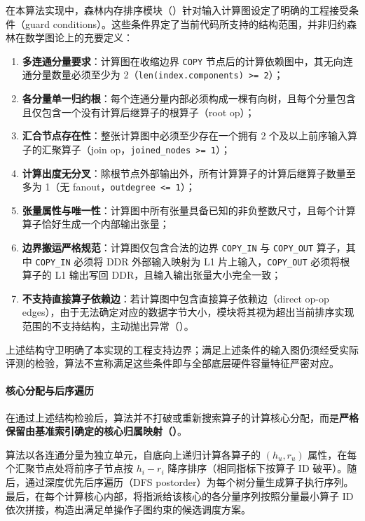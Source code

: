 \documentclass[anonymous,withtoc]{gmcm2026}
\providecommand{\tightlist}{\setlength{\itemsep}{0pt}\setlength{\parskip}{0pt}}
\begin{document}
在本算法实现中，森林内存排序模块（\texttt{}）针对输入计算图设定了明确的工程接受条件（guard conditions）。这些条件界定了当前代码所支持的结构范围，并非归约森林在数学图论上的充要定义：

\begin{enumerate}
\def\labelenumi{\arabic{enumi}.}
\tightlist
\item
  \textbf{多连通分量要求}：计算图在收缩边界 \texttt{COPY} 节点后的计算依赖图中，其无向连通分量数量必须至少为 2（\texttt{len(index.components)\ \textgreater{}=\ 2}）；
\item
  \textbf{各分量单一归约根}：每个连通分量内部必须构成一棵有向树，且每个分量包含且仅包含一个没有计算后继算子的根算子（root op）；
\item
  \textbf{汇合节点存在性}：整张计算图中必须至少存在一个拥有 2 个及以上前序输入算子的汇聚算子（join op，\texttt{joined\_nodes\ \textgreater{}=\ 1}）；
\item
  \textbf{计算出度无分叉}：除根节点外部输出外，所有计算算子的计算后继算子数量至多为 1（无 fanout，\texttt{outdegree\ \textless{}=\ 1}）；
\item
  \textbf{张量属性与唯一性}：计算图中所有张量具备已知的非负整数尺寸，且每个计算算子恰好生成一个内部输出张量；
\item
  \textbf{边界搬运严格规范}：计算图仅包含合法的边界 \texttt{COPY\_IN} 与 \texttt{COPY\_OUT} 算子，其中 \texttt{COPY\_IN} 必须将 DDR 外部输入映射为 L1 片上输入，\texttt{COPY\_OUT} 必须将根算子的 L1 输出写回 DDR，且输入输出张量大小完全一致；
\item
  \textbf{不支持直接算子依赖边}：若计算图中包含直接算子依赖边（direct op-op edges），由于无法确定对应的数据字节大小，模块将其视为超出当前排序实现范围的不支持结构，主动抛出异常（\texttt{}）。
\end{enumerate}

上述结构守卫明确了本实现的工程支持边界；满足上述条件的输入图仍须经受实际评测的检验，算法不宣称满足这些条件即与全部底层硬件容量特征严密对应。

\paragraph{核心分配与后序遍历}

在通过上述结构检验后，算法并不打破或重新搜索算子的计算核心分配，而是\textbf{严格保留由基准索引确定的核心归属映射（\texttt{}）}。

算法以各连通分量为独立单元，自底向上递归计算各算子的 \((h_u, r_u)\) 属性，在每个汇聚节点处将前序子节点按 \(h_i - r_i\) 降序排序（相同指标下按算子 ID 破平）。随后，通过深度优先后序遍历（DFS postorder）为每个树分量生成算子执行序列。最后，在每个计算核心内部，将指派给该核心的各分量序列按照分量最小算子 ID 依次拼接，构造出满足单操作子图约束的候选调度方案。
\end{document}
